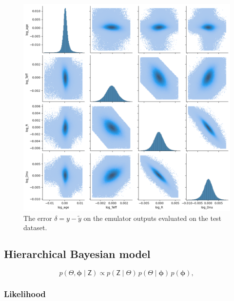 \documentclass[fleqn,usenatbib]{mnras}
\renewcommand*{\vec}[1]{\boldsymbol{#1}}
\newcommand*{\mat}[1]{\boldsymbol{\mathsf{#1}}}
\begin{document}
\begin{figure}
    \centering
    \includegraphics[width=1.0\linewidth]{figures/error.png}
    \caption{The error \(\delta = y - \tilde{y}\) on the emulator outputs evaluated on the test dataset.}
    \label{fig:error}
\end{figure}

\subsection{Hierarchical Bayesian model}
\label{sec:hbm}
%
\begin{equation}
    p(\mat\Theta, \vec\phi \mid \mat{Z}) \propto p(\mat{Z} \mid \mat\Theta) \, p(\mat\Theta \mid \vec\phi) \, p(\vec\phi),
\end{equation}
%

\subsubsection{Likelihood}
\end{document}
